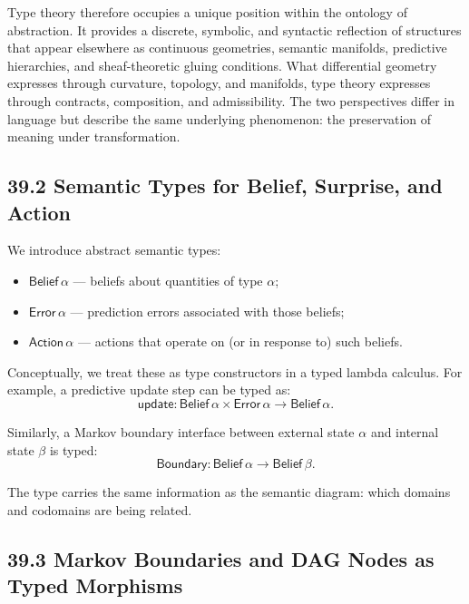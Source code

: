 \documentclass[12pt,letterpaper]{article}
\theoremstyle{remark}
\begin{document}
Type theory therefore occupies a unique position within the ontology of abstraction. It provides a discrete, symbolic, and syntactic reflection of structures that appear elsewhere as continuous geometries, semantic manifolds, predictive hierarchies, and sheaf-theoretic gluing conditions. What differential geometry expresses through curvature, topology, and manifolds, type theory expresses through contracts, composition, and admissibility. The two perspectives differ in language but describe the same underlying phenomenon: the preservation of meaning under transformation.


\subsection{39.2 Semantic Types for Belief, Surprise, and Action}

We introduce abstract semantic types:

\begin{itemize}
  \item $\mathsf{Belief}\,\alpha$ --- beliefs about quantities of type $\alpha$;
  \item $\mathsf{Error}\,\alpha$ --- prediction errors associated with those beliefs;
  \item $\mathsf{Action}\,\alpha$ --- actions that operate on (or in response to) such beliefs.
\end{itemize}

Conceptually, we treat these as type constructors in a typed lambda calculus. For example, a predictive update step can be typed as:
\[
\mathsf{update} : \mathsf{Belief}\,\alpha \times \mathsf{Error}\,\alpha \to \mathsf{Belief}\,\alpha.
\]

Similarly, a Markov boundary interface between external state $\alpha$ and internal state $\beta$ is typed:
\[
\mathsf{Boundary} : \mathsf{Belief}\,\alpha \to \mathsf{Belief}\,\beta.
\]

The type carries the same information as the semantic diagram: which domains and codomains are being related.

\subsection{39.3 Markov Boundaries and DAG Nodes as Typed Morphisms}
\end{document}
